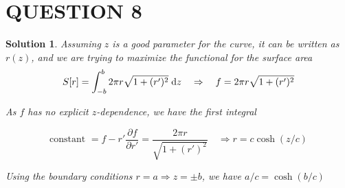 \documentclass[a4paper]{article}
\newtheorem*{soln}{Solution}
\begin{document}
\section{QUESTION 8}

\begin{soln}
	Assuming $ z $ is a good parameter for the curve, it can be written as $ r(z) $, and we are trying to maximize the functional for the surface area
	\[ S[r] = \int_{-b}^{b} 2 \pi r \sqrt{ 1 + (r')^{2}} \; \mathrm{d} z  \quad \Rightarrow \quad f = 2 \pi r \sqrt{ 1 + (r')^{2}} \]
	
	As $ f $ has no explicit $ z $-dependence, we have the first integral 
	
	\[ \text{constant } = f - r' \frac{\partial f }{\partial r'} = \frac{2 \pi r}{\sqrt{1 + (r')^{2}}} \quad \Rightarrow r = c \cosh (z / c)\]
	
	Using the boundary conditions $ r = a \Rightarrow z = \pm b $, we have $ a / c = \cosh(  b / c) $
\end{soln}
\end{document}
